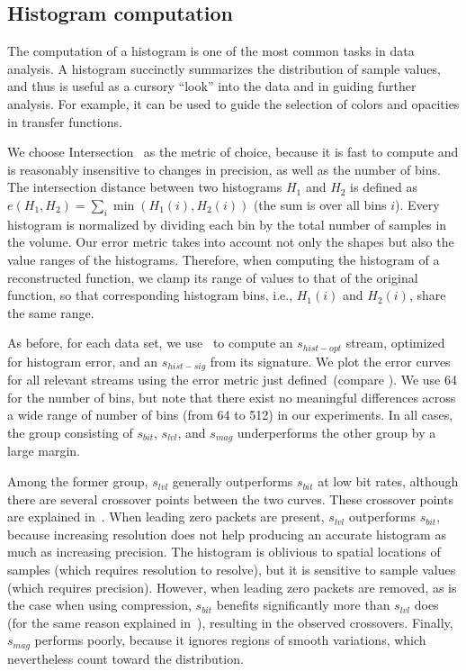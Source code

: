 \subsection{Histogram computation}\label{sec:histogram}

The computation of a histogram is one of the most common tasks in data analysis. A histogram
succinctly summarizes the distribution of sample values, and thus is useful as a cursory ``look''
into the data and in guiding further analysis. For example, it can be used to guide the selection of
colors and opacities in transfer functions.

We choose Intersection~\cite{histogram_intersection1991} as the metric of choice, because it is fast
to compute and is reasonably insensitive to changes in precision, as well as the number of bins. The
intersection distance between two histograms $H_1$ and $H_2$ is defined as
$e(H_1,H_2)=\sum_{i}{\min{(H_1(i),H_2(i))}}$ (the sum is over all bins $i$). Every histogram is
normalized by dividing each bin by the total number of samples in the volume. Our error metric takes
into account not only the shapes but also the value ranges of the histograms. Therefore, when
computing the histogram of a reconstructed function, we clamp its range of values to that of the
original function, so that corresponding histogram bins, i.e., $H_1(i)$ and $H_2(i)$, share the same
range.

As before, for each data set, we use~ to compute an $s_{hist-opt}$ stream,
optimized for histogram error, and an $s_{hist-sig}$ from its signature. We plot the error curves
for all relevant streams using the error metric just defined~(compare
). We use 64 for the number of bins, but note that there exist
no meaningful differences across a wide range of number of bins (from 64 to 512) in our experiments.
In all cases, the group consisting of $s_{bit}$, $s_{lvl}$, and $s_{mag}$ underperforms the other
group by a large margin.

Among the former group, $s_{lvl}$ generally outperforms $s_{bit}$ at low bit rates, although there
are several crossover points between the two curves. These crossover points are explained
in~. When leading zero packets are present, $s_{lvl}$ outperforms
$s_{bit}$, because increasing resolution does not help producing an accurate histogram as much as
increasing precision. The histogram is oblivious to spatial locations of samples (which requires
resolution to resolve), but it is sensitive to sample values (which requires precision). However,
when leading zero packets are removed, as is the case when using compression, $s_{bit}$ benefits
significantly more than $s_{lvl}$ does (for the same reason explained in~),
resulting in the observed crossovers. Finally, $s_{mag}$ performs poorly, because it ignores regions
of smooth variations, which nevertheless count toward the distribution.

